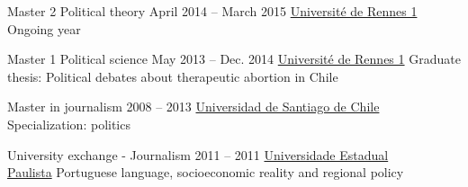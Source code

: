 


%
%




\def\tbflanguage{english}



\begin{coordinatelist}
\end{coordinatelist}










%
%




\begin{yearlist}

\item[Master 2 Political theory]{April 2014 -- March 2015}
     {\href{https://formations.univ-rennes1.fr/formations/master-2-theorie-politique}{Université de Rennes 1}}
     {Ongoing year}
     

 \item[Master 1 Political science]{May 2013 -- Dec. 2014}
     {\href{https://formations.univ-rennes1.fr/formations/master-1-science-politique}{Université de Rennes 1}}
	 {Graduate thesis: Political debates about therapeutic abortion in Chile}


\item[Master in journalism]{2008 -- 2013}
     {\href{http://periodismo.usach.cl/} {Universidad de Santiago de Chile}}
     {Specialization: politics}


\item[University exchange - Journalism]{2011 -- 2011}
     {\href{http://www.unesp.br/} {Universidade Estadual \\ Paulista}}
     {Portuguese language, socioeconomic reality and regional policy}


\end{yearlist}





